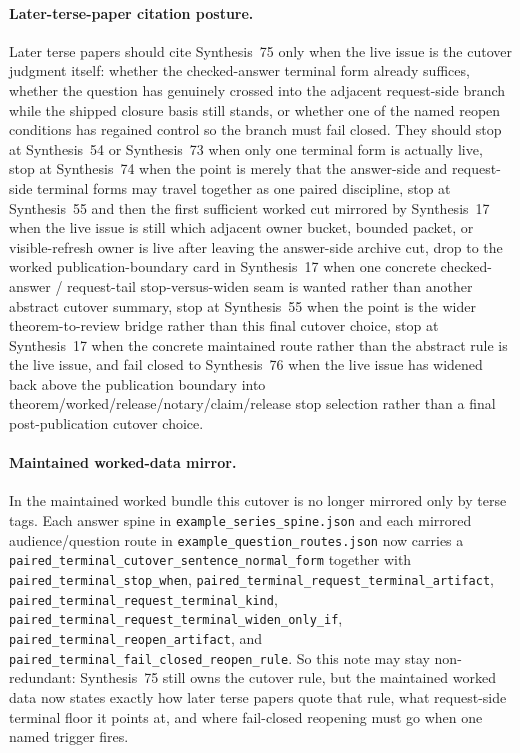 \documentclass[11pt]{article}
\begin{document}
\paragraph{Later-terse-paper citation posture.}
Later terse papers should cite Synthesis~75 only when the live issue is the cutover judgment itself: whether the checked-answer terminal form already suffices, whether the question has genuinely crossed into the adjacent request-side branch while the shipped closure basis still stands, or whether one of the named reopen conditions has regained control so the branch must fail closed.
They should stop at Synthesis~54 or Synthesis~73 when only one terminal form is actually live, stop at Synthesis~74 when the point is merely that the answer-side and request-side terminal forms may travel together as one paired discipline, stop at Synthesis~55 and then the first sufficient worked cut mirrored by Synthesis~17 when the live issue is still which adjacent owner bucket, bounded packet, or visible-refresh owner is live after leaving the answer-side archive cut, drop to the worked publication-boundary card in Synthesis~17 when one concrete checked-answer / request-tail stop-versus-widen seam is wanted rather than another abstract cutover summary, stop at Synthesis~55 when the point is the wider theorem-to-review bridge rather than this final cutover choice, stop at Synthesis~17 when the concrete maintained route rather than the abstract rule is the live issue, and fail closed to Synthesis~76 when the live issue has widened back above the publication boundary into theorem/worked/release/notary/claim/release stop selection rather than a final post-publication cutover choice.

\paragraph{Maintained worked-data mirror.}
In the maintained worked bundle this cutover is no longer mirrored only by terse tags. Each answer spine in \nolinkurl{example_series_spine.json} and each mirrored audience/question route in \nolinkurl{example_question_routes.json} now carries a \texttt{paired\_terminal\_cutover\_sentence\_normal\_form} together with \texttt{paired\_terminal\_stop\_when}, \texttt{paired\_terminal\_request\_terminal\_artifact}, \texttt{paired\_terminal\_request\_terminal\_kind}, \texttt{paired\_terminal\_request\_terminal\_widen\_only\_if}, \texttt{paired\_terminal\_reopen\_artifact}, and \texttt{paired\_terminal\_fail\_closed\_reopen\_rule}. So this note may stay non-redundant: Synthesis~75 still owns the cutover rule, but the maintained worked data now states exactly how later terse papers quote that rule, what request-side terminal floor it points at, and where fail-closed reopening must go when one named trigger fires.
\end{document}
